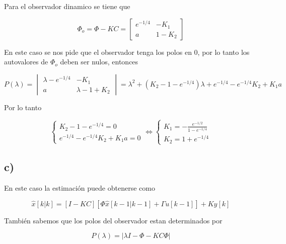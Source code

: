 \documentclass[11pt,a4paper]{article}
\newcommand{\siseq}[1]{ \left\{ \begin{array}{c}
    #1
\end{array} \right. }
\begin{document}
    Para el observador dinamico se tiene que 
    
    \begin{equation}
        \Phi_o = \Phi - KC = 
        \begin{bmatrix}
            e^{-1/4} & -K_1 \\
            a & 1 - K_2
        \end{bmatrix}
    \end{equation}

    En este caso se nos pide que el observador tenga los polos en $0$, por lo tanto 
    los autovalores de $\Phi_o$ deben ser nulos, entonces
    
    \begin{equation}
        P(\lambda) = 
        \begin{vmatrix}
            \lambda - e^{-1/4} & -K_1 \\
            a & \lambda - 1 + K_2
        \end{vmatrix} = 
        \lambda ^ 2 + ( K_2 - 1 - e^{-1/4}) \lambda +e^{-1/4} - e^{-1/4}K_2 + K_1a
    \end{equation}

    Por lo tanto 
    
    \begin{equation}
        \siseq{
        K_2 - 1 - e^{-1/4} = 0 \\ 
        e^{-1/4} - e^{-1/4}K_2 + K_1a = 0
        }
        \Leftrightarrow
        \siseq{
            K_1 = - \frac{e^{-1/2}}{1 - e^{-1/4}} \\
            K_2 = 1 + e^{-1/4}
        }
    \end{equation}

    \subsection*{c)}

    En este caso la estimación puede obtenerse como 

    \begin{equation}
        \hat{x}[k|k] = 
        [I - KC][ \Phi \hat{x}[k-1|k-1] + \Gamma u[k-1] ] + Ky[k]
    \end{equation}

    También sabemos que los polos del observador estan determinados por 

    \begin{equation}
        P(\lambda) = | \lambda I - \Phi - KC\Phi |
    \end{equation}
\end{document}
